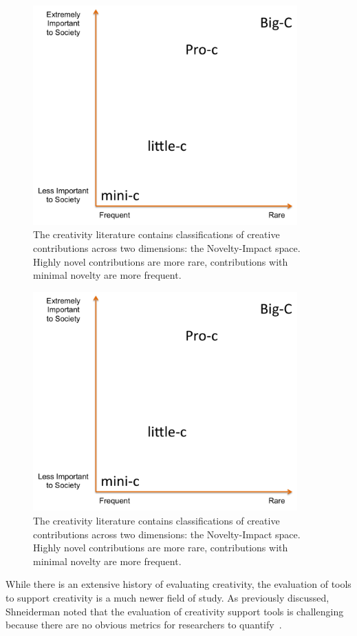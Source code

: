 \begin{figure}[t]
\centering
\includegraphics[width=4in]{images/spectrum.png}
\caption[Novelty-Impact Space of Creativity]{The creativity literature contains classifications of creative contributions across two dimensions: the Novelty-Impact space. Highly novel contributions are more rare, contributions with minimal novelty are more frequent.}
\label{NIspace}
\end{figure}

\begin{figure}[t]
\centering
\includegraphics[width=4in]{images/spectrum.png}
\caption{The creativity literature contains classifications of creative contributions across two dimensions: the Novelty-Impact space. Highly novel contributions are more rare, contributions with minimal novelty are more frequent.}
\end{figure}


\label{CSTEvaluation}
While there is an extensive history of evaluating creativity, the evaluation of tools to support creativity is a much newer field of study. As previously discussed, Shneiderman noted that the evaluation of creativity support tools is challenging because there are no obvious metrics for researchers to quantify~\cite{Shneiderman:2007wp}. 
